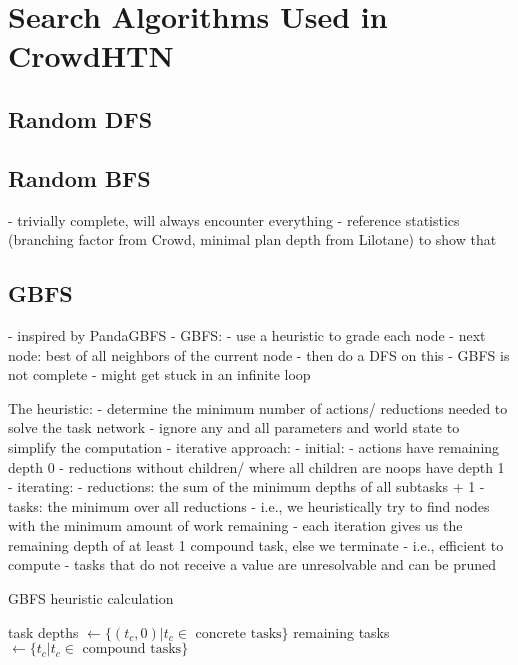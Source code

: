 \section{Search Algorithms Used in CrowdHTN}

\subsection{Random DFS}

\subsection{Random BFS}
- trivially complete, will always encounter everything
- reference statistics (branching factor from Crowd, minimal plan depth from Lilotane) to show that 

\subsection{GBFS}
- inspired by PandaGBFS
- GBFS:
	- use a heuristic to grade each node
	- next node: best of all neighbors of the current node
	- then do a DFS on this
- GBFS is not complete
- might get stuck in an infinite loop

The heuristic:
- determine the minimum number of actions/ reductions needed to solve the task network
- ignore any and all parameters and world state to simplify the computation
- iterative approach:
	- initial:
		- actions have remaining depth 0
		- reductions without children/ where all children are noops have depth 1
	- iterating:
		- reductions: the sum of the minimum depths of all subtasks + 1
		- tasks: the minimum over all reductions
- i.e., we heuristically try to find nodes with the minimum amount of work remaining
- each iteration gives us the remaining depth of at least 1 compound task, else we terminate
- i.e., efficient to compute
- tasks that do not receive a value are unresolvable and can be pruned

\begin{algorithm}
	\caption{GBFS heuristic calculation}
	task depths $\gets \{(t_c, 0) | t_c \in \text{ concrete tasks}\}$\;
	remaining tasks $\gets \{t_c | t_c \in \text{ compound tasks}\}$\;
\end{algorithm}


